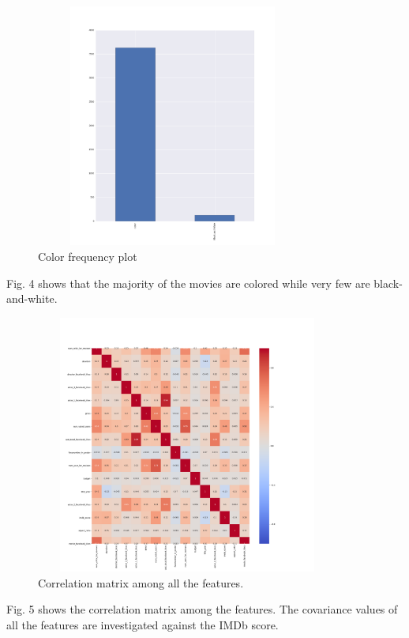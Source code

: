 \documentclass[conference]{IEEEtran}
\begin{document}
\begin{figure}[H]
  \centering	
  \captionsetup{justification=centering}
  \includegraphics[height=8cm, width=9cm, trim={30mm 0mm 20mm 0mm},clip]{../visualizations/Colour-Histogram}
  \caption{Color frequency plot}
  \label{fig:fig4}
\end{figure}
Fig. 4 shows that the majority of the movies are colored while very few are black-and-white.

\begin{figure}[H]
  \centering	
  \captionsetup{justification=centering}
  \includegraphics[height=8.5cm, width=10cm, trim={20mm 20mm 20mm 40mm},clip]{../visualizations/corr_matrix.png}
  \caption{Correlation matrix among all the features.}
  \label{fig:fig5}
\end{figure}
Fig. 5 shows the correlation matrix among the features. The covariance values of all the features are investigated against the IMDb score.

\newpage
\end{document}
